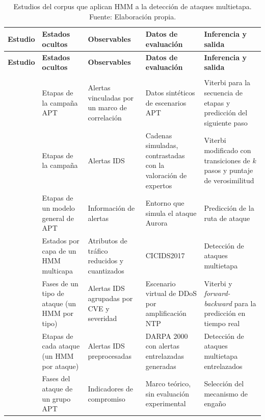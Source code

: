 \newpage
\begin{footnotesize}
\setlength{\tabcolsep}{4pt}
\renewcommand{\arraystretch}{1.2}
\begin{xltabular}{\linewidth}{|>{\raggedright\arraybackslash}p{2.6cm}|*{4}{>{\raggedright\arraybackslash}X|}}
\caption[Estudios del corpus que aplican HMM a la detección de ataques multietapa.]{Estudios del corpus que aplican HMM a la detección de ataques multietapa. Fuente: Elaboración propia.}
\label{tab:hmm} \\
\hline
\textbf{Estudio} & \textbf{Estados ocultos} & \textbf{Observables} & \textbf{Datos de evaluación} & \textbf{Inferencia y salida} \\ \hline
\endfirsthead
\hline
\textbf{Estudio} & \textbf{Estados ocultos} & \textbf{Observables} & \textbf{Datos de evaluación} & \textbf{Inferencia y salida} \\ \hline
\endhead
\hline
{} \\ \hline
\endfoot
\hline
\endlastfoot
\textcite{ghafir2019hmm} & Etapas de la campaña APT & Alertas vinculadas por un marco de correlación & Datos sintéticos de escenarios APT & Viterbi para la secuencia de etapas y predicción del siguiente paso \\ \hline
\textcite{brogi_hidden_2019} & Etapas de la campaña & Alertas IDS & Cadenas simuladas, contrastadas con la valoración de expertos & Viterbi modificado con transiciones de $k$ pasos y puntaje de verosimilitud \\ \hline
\textcite{du_attack_2019} & Etapas de un modelo general de APT & Información de alertas & Entorno que simula el ataque Aurora & Predicción de la ruta de ataque \\ \hline
\textcite{zegeye_multi-layer_2019} & Estados por capa de un HMM multicapa & Atributos de tráfico reducidos y cuantizados & CICIDS2017 & Detección de ataques multietapa \\ \hline
\textcite{holgado_real-time_2020} & Fases de un tipo de ataque (un HMM por tipo) & Alertas IDS agrupadas por CVE y severidad & Escenario virtual de DDoS por amplificación NTP & Viterbi y \textit{forward-backward} para la predicción en tiempo real \\ \hline
\textcite{t_shawly_architectures_2021} & Etapas de cada ataque (un HMM por ataque) & Alertas IDS preprocesadas & DARPA 2000 con alertas entrelazadas generadas & Detección de ataques multietapa entrelazados \\ \hline
\textcite{baksi_decepticon_2021} & Fases del ataque de un grupo APT & Indicadores de compromiso & Marco teórico, sin evaluación experimental & Selección del mecanismo de engaño \\ \hline

\end{xltabular}
\end{footnotesize}
